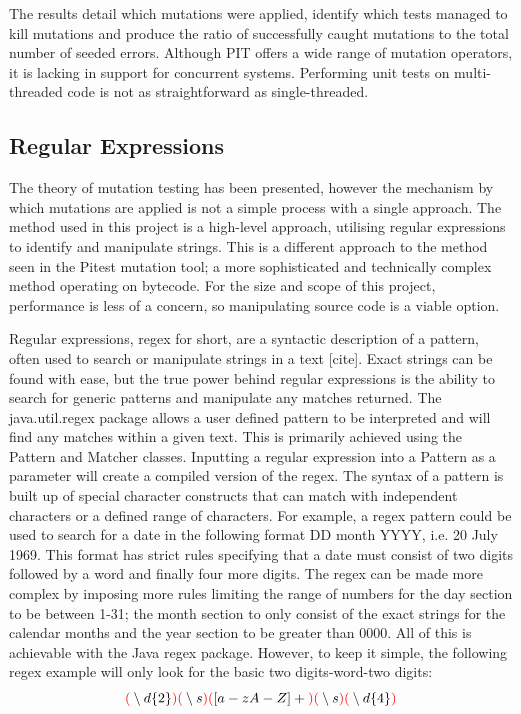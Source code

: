 \documentclass[a4paper,12pt]{article}
\begin{document}
The results detail which mutations were applied, identify which tests managed to kill mutations and produce the ratio of successfully caught mutations to the total number of seeded errors. Although PIT offers a wide range of mutation operators, it is lacking in support for concurrent systems. Performing unit tests on multi-threaded code is not as straightforward as single-threaded.


\subsection{Regular Expressions}    

The theory of mutation testing has been presented, however the mechanism by which mutations are applied is not a simple process with a single approach. The method used in this project is a high-level approach, utilising regular expressions to identify and manipulate strings. This is a different approach to the method seen in the Pitest mutation tool; a more sophisticated and technically complex method operating on bytecode. For the size and scope of this project, performance is less of a concern, so manipulating source code is a viable option. 

Regular expressions, regex for short, are a syntactic description of a pattern, often used to search or manipulate strings in a text [cite]. Exact strings can be found with ease, but the true power behind regular expressions is the ability to search for generic patterns and manipulate any matches returned. The java.util.regex package allows a user defined pattern to be interpreted and will find any matches within a given text. This is primarily achieved using the Pattern and Matcher classes. Inputting a regular expression into a Pattern as a parameter will create a compiled version of the regex. The syntax of a pattern is built up of special character constructs that can match with independent characters or a defined range of characters. For example, a regex pattern could be used to search for a date in the following format DD month YYYY, i.e. 20 July 1969. This format has strict rules specifying that a date must consist of two digits followed by a word and finally four more digits. The regex can be made more complex by imposing more rules limiting the range of numbers for the day section to be between 1-31; the month section to only consist of the exact strings for the calendar months and the year section to be greater than 0000. All of this is achievable with the Java regex package. However, to keep it simple, the following regex example will only look for the basic two digits-word-two digits:
\begin{equation}
    \textbf{$\color{red}($} \setminus d\{2\} \textbf{$\color{red})($} \setminus s \textbf{$\color{red})($} [a-zA-Z]+ \textbf{$\color{red})($} \setminus s \textbf{$\color{red})($} \setminus d\{4\} \textbf{$\color{red})$}
\end{equation}
\end{document}
